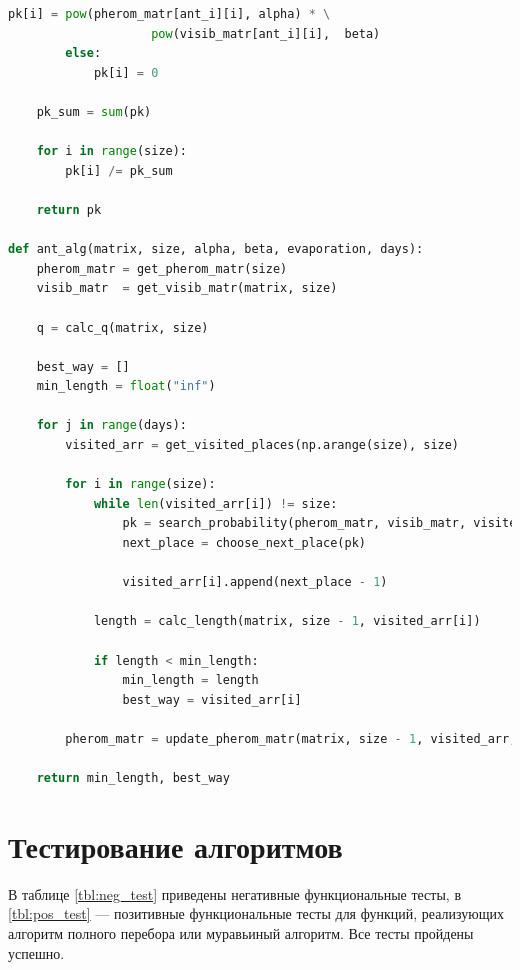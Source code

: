 \documentclass[a4paper,14pt, unknownkeysallowed]{extreport}
\begin{document}
\begin{lstlisting}[label=ant,caption=Реализация муравьиного алгорима,language=Python]
            pk[i] = pow(pherom_matr[ant_i][i], alpha) * \
                    pow(visib_matr[ant_i][i],  beta)
        else:
            pk[i] = 0

    pk_sum = sum(pk)
    
    for i in range(size):
        pk[i] /= pk_sum  

    return pk

def ant_alg(matrix, size, alpha, beta, evaporation, days):
    pherom_matr = get_pherom_matr(size)
    visib_matr  = get_visib_matr(matrix, size)

    q = calc_q(matrix, size)

    best_way = []
    min_length = float("inf")

    for j in range(days):
        visited_arr = get_visited_places(np.arange(size), size)

        for i in range(size):
            while len(visited_arr[i]) != size:
                pk = search_probability(pherom_matr, visib_matr, visited_arr, size, i, alpha, beta)  
                next_place = choose_next_place(pk)

                visited_arr[i].append(next_place - 1)

            length = calc_length(matrix, size - 1, visited_arr[i])
            
            if length < min_length:
                min_length = length
                best_way = visited_arr[i]

        pherom_matr = update_pherom_matr(matrix, size - 1, visited_arr, pherom_matr, q, evaporation)

    return min_length, best_way
\end{lstlisting}

\section{Тестирование алгоритмов}

В таблице \ref{tbl:neg_test} приведены негативные функциональные тесты, в \ref{tbl:pos_test} --- позитивные функциональные тесты для функций, реализующих алгоритм полного перебора или муравьиный алгоритм. Все тесты пройдены успешно.
\end{document}
